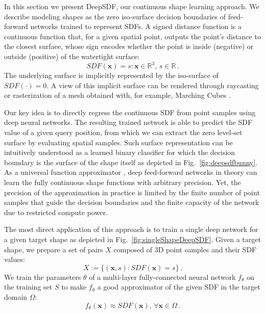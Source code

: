 \documentclass[10pt,twocolumn,letterpaper]{article}
\begin{document}
In this section we present DeepSDF, our continuous shape learning approach. We describe modeling shapes as the zero iso-surface decision boundaries of feed-forward networks trained to represent SDFs.
A signed distance function is a continuous function that, for a given spatial point, outputs the point's distance to the closest surface, whose sign encodes whether the point is inside (negative) or outside (positive) of the watertight surface:
\begin{equation} \label{eq:sdf}
   SDF(\bm{x}) = s: \bm{x}\in \mathbb{R}^3,\, s\in \mathbb{R}\,.
\end{equation} 
The underlying surface is implicitly represented by the iso-surface of $SDF(\cdot)=0$. A view of this implicit surface can be rendered through raycasting or rasterization of a mesh obtained with, for example, Marching Cubes \cite{lorensen1987marching}. 

Our key idea is to directly regress the continuous SDF from point samples using deep neural networks. The resulting trained network is able to predict the SDF value of a given query position, from which we can extract the zero level-set surface by evaluating spatial samples. Such surface representation can be intuitively understood as a learned binary classifier for which the decision boundary is the surface of the shape itself as depicted in Fig.~\ref{fig:deepsdfbunny}. As a universal function approximator \cite{hornik1989multilayer}, deep feed-forward networks in theory can learn the fully continuous shape functions with arbitrary precision. Yet, the precision of the approximation in practice is limited by the finite number of point samples that guide the decision boundaries and the finite capacity of the network due to restricted compute power.


The most direct application of this approach is to train a single deep network for a given target shape as depicted in Fig.~\ref{fig:singleShapeDeepSDF}.
Given a target shape, we prepare a set of pairs $X$ composed of 3D point samples and their SDF values:
\begin{equation} \label{eq:sdfdef} 
    X:=\{ (\bm{x}, s) : SDF(\bm{x})=s\}\,.
\end{equation}
We train the parameters $\theta$ of a multi-layer fully-connected neural network $f_\theta$ on the training set $S$ to make $f_\theta$ a good approximator of the given SDF in the target domain $\Omega$:
\begin{equation} \label{eq:f}
  f_\theta(\bm{x})\approx SDF(\bm{x}), \,\forall \bm{x}\in \Omega\,.
\end{equation}
\end{document}
